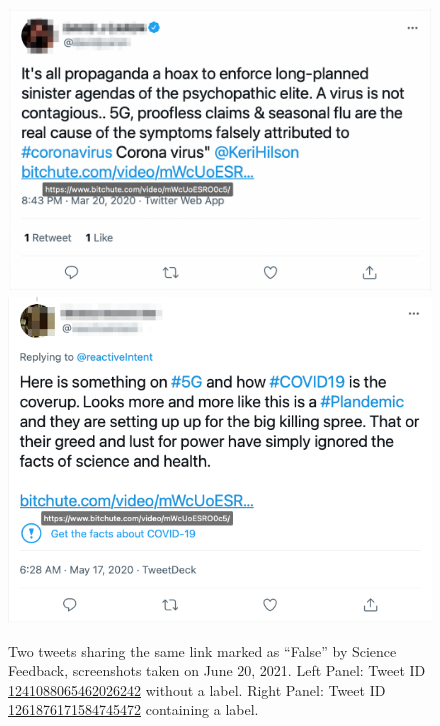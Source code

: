 \documentclass{article}
\begin{document}
\begin{figure}[h]
\centering
		\includegraphics[scale=0.35]{./img/tweets/Capture_2021-06-30_2.png}
		\includegraphics[scale=0.32]{./img/tweets/Capture_2021-06-30.png}
	\caption{Two tweets sharing the same link marked as ``False'' by Science Feedback, screenshots taken on June $20$, 2021. Left Panel: Tweet ID \href{https://twitter.com/davidjcaron/status/1241088065462026242}{1241088065462026242} without a label. Right Panel: Tweet ID \href{https://twitter.com/reactiveIntent/status/1261876171584745472}{1261876171584745472} containing a label.}
	\label{fig8}
\end{figure}
\end{document}
